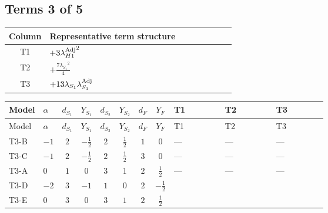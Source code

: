 \documentclass[8pt]{article}
\begin{document}
\begin{landscape}
\subsection*{Terms 3 of 5}
\begin{center}
\begin{tabular}{@{}c >{\raggedright\arraybackslash}p{0.82\linewidth}@{}}
\toprule
Column & Representative term structure \\
\midrule
T1 & \(\displaystyle +3 {\lambda_{H1}^{\rm Adj}}^2\) \\
\midrule
T2 & \(\displaystyle +\frac{7 {\lambda_{S_1}}^2}{4}\) \\
\midrule
T3 & \(\displaystyle +13 {\lambda_{S_1}} {\lambda_{S_1}^{\rm Adj}}\) \\
\midrule
\bottomrule
\end{tabular}
\end{center}
\smallskip
\tiny
\begin{longtable}{@{}llcccccc >{\raggedright\arraybackslash}p{0.21\linewidth} >{\raggedright\arraybackslash}p{0.21\linewidth} >{\raggedright\arraybackslash}p{0.21\linewidth}@{}}
\toprule
Model & $\alpha$ & $d_{S_1}$ & $Y_{S_1}$ & $d_{S_2}$ & $Y_{S_2}$ & $d_F$ & $Y_F$ & T1 & T2 & T3 \\
\midrule
\endfirsthead
\toprule
Model & $\alpha$ & $d_{S_1}$ & $Y_{S_1}$ & $d_{S_2}$ & $Y_{S_2}$ & $d_F$ & $Y_F$ & T1 & T2 & T3 \\
\midrule
\endhead
T3-B & $-1$ & $2$ & $-\frac{1}{2}$ & $2$ & $\frac{1}{2}$ & $1$ & $0$ & --- & --- & --- \\
\midrule
T3-C & $-1$ & $2$ & $-\frac{1}{2}$ & $2$ & $\frac{1}{2}$ & $3$ & $0$ & --- & --- & --- \\
\midrule
T3-A & $0$ & $1$ & $0$ & $3$ & $1$ & $2$ & $\frac{1}{2}$ & --- & --- & --- \\
\midrule
T3-D & $-2$ & $3$ & $-1$ & $1$ & $0$ & $2$ & $-\frac{1}{2}$ & \scriptsize\adjustbox{max width=\linewidth}{$\begin{gathered} +3 {\lambda_{H1}^{\rm Adj}}^2\end{gathered}$} & \scriptsize\adjustbox{max width=\linewidth}{$\begin{gathered} +\frac{7 {\lambda_{S_1}}^2}{4}\end{gathered}$} & \scriptsize\adjustbox{max width=\linewidth}{$\begin{gathered} +13 {\lambda_{S_1}} {\lambda_{S_1}^{\rm Adj}}\end{gathered}$} \\
\midrule
T3-E & $0$ & $3$ & $0$ & $3$ & $1$ & $2$ & $\frac{1}{2}$ & \scriptsize\adjustbox{max width=\linewidth}{$\begin{gathered} +3 {\lambda_{H1}^{\rm Adj}}^2\end{gathered}$} & \scriptsize\adjustbox{max width=\linewidth}{$\begin{gathered} +\frac{7 {\lambda_{S_1}}^2}{4}\end{gathered}$} & \scriptsize\adjustbox{max width=\linewidth}{$\begin{gathered} +13 {\lambda_{S_1}} {\lambda_{S_1}^{\rm Adj}}\end{gathered}$} \\

\end{longtable}
\end{landscape}
\end{document}
